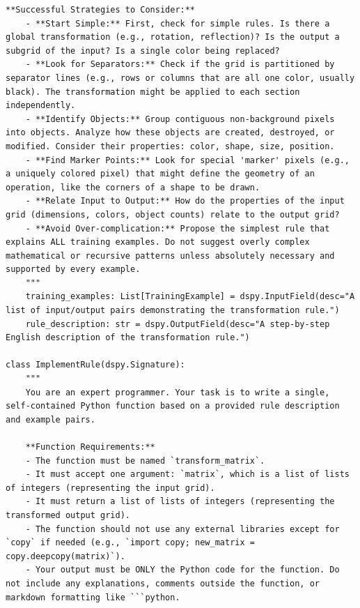 \begin{instructbox}
\begin{lstlisting}[breakindent=0pt, breaklines=true, breakatwhitespace=true, frame=single, backgroundcolor=\color{blue!10}]
    **Successful Strategies to Consider:**
    - **Start Simple:** First, check for simple rules. Is there a global transformation (e.g., rotation, reflection)? Is the output a subgrid of the input? Is a single color being replaced?
    - **Look for Separators:** Check if the grid is partitioned by separator lines (e.g., rows or columns that are all one color, usually black). The transformation might be applied to each section independently.
    - **Identify Objects:** Group contiguous non-background pixels into objects. Analyze how these objects are created, destroyed, or modified. Consider their properties: color, shape, size, position.
    - **Find Marker Points:** Look for special 'marker' pixels (e.g., a uniquely colored pixel) that might define the geometry of an operation, like the corners of a shape to be drawn.
    - **Relate Input to Output:** How do the properties of the input grid (dimensions, colors, object counts) relate to the output grid?
    - **Avoid Over-complication:** Propose the simplest rule that explains ALL training examples. Do not suggest overly complex mathematical or recursive patterns unless absolutely necessary and supported by every example.
    """
    training_examples: List[TrainingExample] = dspy.InputField(desc="A list of input/output pairs demonstrating the transformation rule.")
    rule_description: str = dspy.OutputField(desc="A step-by-step English description of the transformation rule.")

class ImplementRule(dspy.Signature):
    """
    You are an expert programmer. Your task is to write a single, self-contained Python function based on a provided rule description and example pairs.

    **Function Requirements:**
    - The function must be named `transform_matrix`.
    - It must accept one argument: `matrix`, which is a list of lists of integers (representing the input grid).
    - It must return a list of lists of integers (representing the transformed output grid).
    - The function should not use any external libraries except for `copy` if needed (e.g., `import copy; new_matrix = copy.deepcopy(matrix)`).
    - Your output must be ONLY the Python code for the function. Do not include any explanations, comments outside the function, or markdown formatting like ```python.


\end{lstlisting}
\end{instructbox}
